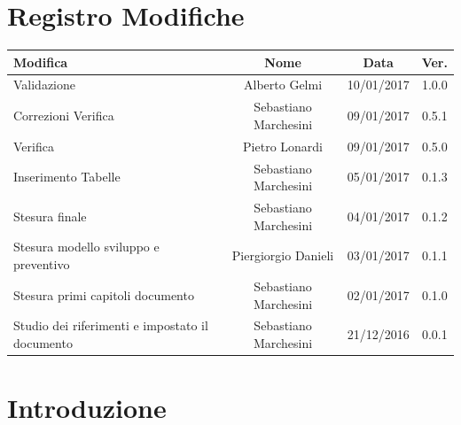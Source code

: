 \documentclass[12pt,a4paper,titlepage]{article}
\begin{document}
	
	
	\clearpage %
	

\chead{}
\cfoot{}
\rfoot{\thepage}
\renewcommand{\headrulewidth}{0.2pt}
\renewcommand{\footrulewidth}{0.2pt}

\section{Registro Modifiche}
\small %

{\renewcommand\arraystretch{1.2} %
\begin{tabular}{|l|c|c|c|}
		\hline
		{\textbf{Modifica}}&{\textbf{Nome}}&{\textbf{Data}}&{\textbf{Ver.}}\\
			\hline
			Validazione & Alberto Gelmi & 10/01/2017 & 1.0.0 \\
			\hline
			Correzioni Verifica & Sebastiano Marchesini & 09/01/2017 & 0.5.1 \\
			\hline
			Verifica & Pietro Lonardi & 09/01/2017 & 0.5.0 \\
			\hline
			Inserimento Tabelle & Sebastiano Marchesini & 05/01/2017 & 0.1.3 \\
			\hline
			Stesura finale & Sebastiano Marchesini & 04/01/2017 & 0.1.2 \\
			\hline
			Stesura modello sviluppo e preventivo & Piergiorgio Danieli & 03/01/2017 & 0.1.1 \\
			\hline
			Stesura primi capitoli documento & Sebastiano Marchesini & 02/01/2017 & 0.1.0 \\
			\hline
			Studio dei riferimenti e impostato il documento & Sebastiano Marchesini & 21/12/2016 & 0.0.1 \\
			\hline
\end{tabular}
}
\normalsize

\newpage

\tableofcontents
\thispagestyle{empty}

\newpage


\section{Introduzione}
\end{document}
